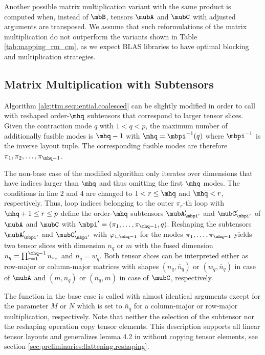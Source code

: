 Another possible matrix multiplication variant with the same product is computed when, instead of $\mbB$, tensors $\mubA$ and $\mubC$ with adjusted arguments are transposed.
We assume that such reformulations of the matrix multiplication do not outperform the variants shown in Table \ref{tab:mapping_rm_cm}, as we expect BLAS libraries to have optimal blocking and multiplication strategies.


\subsection{Matrix Multiplication with Subtensors}
\label{sec:design:blas.based.algorithm.subtensors}
Algorithm \ref{alg:ttm.sequential.coalesced} can be slightly modified in order to call  with reshaped order-$\mhq$ subtensors that correspond to larger tensor slices.
Given the contraction mode $q$ with $1 < q < p$, the maximum number of additionally fusible modes is $\mhq-1$ with $\mhq = \mbpi^{-1}(q)$ where $\mbpi^{-1}$ is the inverse layout tuple.
The corresponding fusible modes are therefore $\pi_1,\pi_2,\dots,\pi_{\mhq-1}$.

The non-base case of the modified algorithm only iterates over dimensions that have indices larger than $\mhq$ and thus omitting the first $\mhq$ modes.
The conditions in line 2 and 4 are changed to $1 < r \leq \mhq$ and $\mhq < r$, respectively.
Thus, loop indices belonging to the outer $\pi_r$-th loop with $\mhq+1 \leq r \leq p$ define the order-$\mhq$ subtensors $\mubA_{\mbpi'}'$ and $\mubC_{\mbpi'}'$ of $\mubA$ and $\mubC$ with $\mbpi' = (\pi_1,\dots,\pi_{\mhq-1},q)$.
Reshaping the subtensors $\mubA_{\mbpi'}'$ and $\mubC_{\mbpi'}'$ with $\varphi_{1,\mhq-1}$ for the modes $\pi_1,\dots,\pi_{\mhq-1}$ yields two tensor slices with dimension $n_q$ or $m$ with the fused dimension $\bar{n}_q = \prod_{r=1}^{\mhq-1} n_{\pi_r}$ and $\bar{n}_q = w_q$.
Both tensor slices can be interpreted either as row-major or column-major matrices with shapes $(n_q,\bar{n}_q)$ or $(w_q,\bar{n}_q)$ in case of $\mubA$ and $(m,\bar{n}_q)$ or $(\bar{n}_q,m)$ in case of $\mubC$, respectively.

The  function in the base case is called with almost identical arguments except for the parameter $M$ or $N$ which is set to $\bar{n}_q$ for a column-major or row-major multiplication, respectively.
Note that neither the selection of the subtensor nor the reshaping operation copy tensor elements.
This description supports all linear tensor layouts and generalizes lemma 4.2 in \cite{li:2015:input} without copying tensor elements, see section \ref{sec:preliminaries:flattening.reshaping}.

